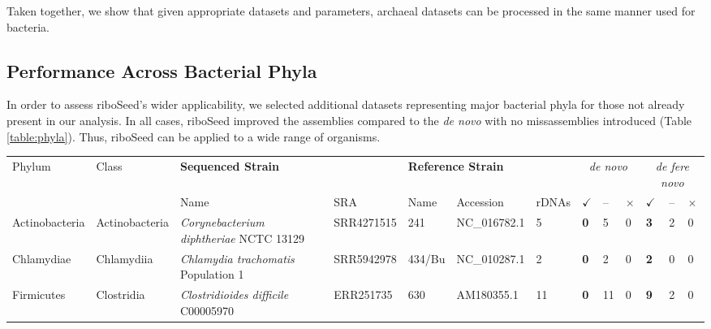 Taken together, we show that given appropriate datasets and parameters, archaeal datasets can be processed in the same manner used for bacteria.

\subsection*{Performance Across Bacterial Phyla}
In order to assess riboSeed's wider applicability, we selected additional datasets representing major bacterial phyla for those not already present in our analysis. In all cases, riboSeed improved the assemblies compared to the \textit{de novo} with no missassemblies introduced (Table \ref{table:phyla}). Thus, riboSeed can be applied to a wide range of organisms.

\begin{sidewaystable}[!hb]
  \centering
  \caption{Comparison of \textit{de novo} and riboSeed's \textit{de fere novo} assemblies}
  \label{table:phyla}
  \begin{tabular}{p{2.25cm}p{2.65cm}p{5.75cm}p{1.75cm}p{2.25cm}p{1.95cm}p{.6cm}>{\hfill}p{.4cm}p{.2cm}p{.1cm}>{\hfill}p{.4cm}p{.2cm}p{.1cm}}
    \toprule
    \multirow{2}{*}{Phylum} & \multirow{2}{*}{Class}  & \multicolumn{2}{l}{\textbf{Sequenced Strain}}  &  \multicolumn{3}{l}{\textbf{Reference Strain}} &  \multicolumn{3}{c}{\textit{de novo}} & \multicolumn{3}{c}{\textit{de fere novo}} \\
    & & Name & SRA & Name & Accession & rDNAs & \textbf{$\checkmark$} & -- & $\times$ & \textbf{$\checkmark$} & -- & $\times$  \\
    \toprule
    Actinobacteria & Actinobacteria        & \textit{Corynebacterium  diphtheriae}   NCTC 13129      & SRR4271515 & 241 &  NC\_016782.1      & 5  & \textbf{0} & 5  & 0 & \textbf{3} & 2 & 0 \\
    Chlamydiae     & Chlamydiia            & \textit{Chlamydia        trachomatis}  Population 1 & SRR5942978 & 434/Bu & NC\_010287.1     & 2  & \textbf{0} & 2  & 0 & \textbf{2} & 0 & 0 \\
    Firmicutes     & Clostridia            & \textit{Clostridioides   difficile}    C00005970                                             & ERR251735  & 630  &AM180355.1       & 11 & \textbf{0} & 11 & 0 & \textbf{9} & 2 & 0 \\

\end{tabular}
\end{sidewaystable}
